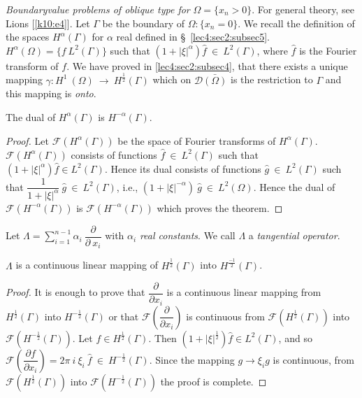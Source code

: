 \textit{Boundary\pageoriginale value problems of oblique type for} $\Omega = \{ x_n
> 0\}$. For general theory, see Lions [\ref{k10:e4}]. Let $\Gamma$ be the
boundary of $\Omega : \{ x_n = 0 \}$. We recall the definition of the
spaces $H^\alpha(\Gamma)$ for $\alpha$ real defined in \S\ \ref{lec4:sec2:subsec5}.
 $H^\alpha (\Omega) = \{ f ~ L^2(\Gamma) \}$ such that $(1 + |\xi
|^\alpha) \hat{f} ~ \in ~ L^2 (\Gamma)$, where $\hat{f}$
is the Fourier transform of $f$. We have proved in \ref{lec4:sec2:subsec4}, that there
exists a unique mapping $\gamma : H^1 ~ (\Omega) ~ \rightarrow ~
H^{\frac{1}{2}}(\Gamma)$ which on $\mathscr{D}\bar{(\Omega)}$ is
the restriction to $\Gamma$ and this mapping is \textit{onto}. 

\begin{theorem}\label{lec11:sec6:subsec7:thm6.9}%
  The dual of $H^\alpha (\Gamma)$ is $H^{-\alpha}(\Gamma)$.
\end{theorem}

\begin{proof}%
Let $\mathscr{F}(H^\alpha(\Gamma))$ be the space of Fourier
transforms of
$H^\alpha(\Gamma)$. $\mathscr{F}(H^\alpha(\Gamma))$ consists
of functions $\hat{f} ~ \in ~ L^2 (\Gamma)$ such that $(1 +
| \xi |^\alpha)\hat{f} \in L^2(\Gamma)$. Hence its dual
consists of functions $\hat{g} ~ \in ~ L^2 (\Gamma)$ such
that $\dfrac{1}{1 + | \xi |^{\alpha}} ~\hat{g}~ \in~ L^2
(\Gamma)$, i.e., $(1 + | \xi |^{-\alpha}) ~ \hat{g} ~ \in
~ L^2 (\Omega)$. Hence the dual of
$\mathscr{F}(H^{-\alpha}(\Gamma))$ is
$\mathscr{F}(H^{-\alpha}(\Gamma))$ which proves the theorem. 
\end{proof}

Let $\Lambda = \sum\limits_{i=1}^{n-1} \alpha_i ~
\dfrac{\partial}{\partial ~ x_i}$ with $\alpha_i$ \textit{real
  constants}. We call $\Lambda$ a \textit{tangential operator}. 

\begin{lemma}\label{lec11:sec6:subsec7:lem6.2}%
  $\Lambda$ is a continuous linear mapping of
  $H^{\frac{1}{2}}(\Gamma)$ into $H^{\frac{-1}{2}}(\Gamma)$. 
\end{lemma}
\begin{proof}%
It is enough to prove that $\dfrac{\partial}{\partial x_i}$ is a
continuous linear mapping from $H^{\frac{1}{2}}(\Gamma)$ into
$H^{-\frac{1}{2}}(\Gamma)$ or that $\mathscr{F}
\left(\dfrac{\partial}{\partial x_i}\right)$ is continuous from
$\mathscr{F}(H^{\frac{1}{2}}(\Gamma))$ into\break
$\mathscr{F}\left(H^{-\frac{1}{2}}(\Gamma)\right)$. Let $f \in
H^{\frac{1}{2}}(\Gamma)$. Then $(1 +  | \xi |^{\frac{1}{2}})
\hat{f} \in L^2 (\Gamma)$, and so
$\mathscr{F}\left(\dfrac{\partial f}{\partial x_i}\right) = 2 \pi ~i ~\xi_i ~
\hat{f} ~ \in ~ H^{-\frac{1}{2}}(\Gamma)$. Since the
mapping $g \rightarrow \xi_i g$ is continuous, from
$\mathscr{F}(H^{\frac{1}{2}}(\Gamma ))$ into
$\mathscr{F}(H^{-\frac{1}{2}}(\Gamma))$ the proof is complete. 
\end{proof}

